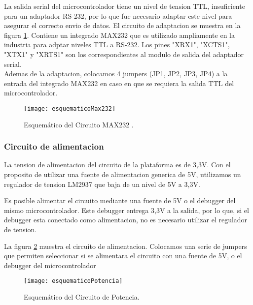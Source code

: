 La salida serial del microcontrolador tiene un nivel de tension TTL, insuficiente para un adaptador RS-232, por lo que fue necesario adaptar este nivel para asegurar el correcto envio de datos. El circuito de adaptacion se muestra en la figura \ref{fig:esquematicoMax232}. Contiene un integrado MAX232 que es utilizado ampliamente en la industria para adptar niveles TTL a RS-232. Los pines "XRX1", "XCTS1", "XTX1" y "XRTS1" son los correspondientes al modulo de salida del adaptador serial. \\

Ademas de la adaptacion, colocamos 4 jumpers (JP1, JP2, JP3, JP4) a la entrada del integrado MAX232 en caso en que se requiera la salida TTL del microcontrolador. \\

\begin{figure}[H]
  \centering
  \texttt{[image: esquematicoMax232]}
  \caption{Esquemático del Circuito MAX232 .}\label{fig:esquematicoMax232}
\end{figure}


\subsubsection{Circuito de alimentacion}
\label{it3:ssub:circuito_de_alimentacion}

La tension de alimentacion del circuito de la plataforma es de 3,3V. Con el proposito de utilizar una fuente de alimentacion generica de 5V, utilizamos un regulador de tension LM2937 que baja de un nivel de 5V a 3,3V.

Es posible alimentar el circuito mediante una fuente de 5V o el debugger del mismo microcontrolador. Este debugger entrega 3,3V a la salida, por lo que, si el debugger esta conectado como alimentacion, no es necesario utilizar el regulador de tension.

La figura \ref{fig:esquematicoPotencia} muestra el circuito de alimentacion. Colocamos una serie de jumpers que permiten seleccionar si se alimentara el circuito con una fuente de 5V, o el debugger del microcontrolador

\begin{figure}[H]
  \centering
  \texttt{[image: esquematicoPotencia]}
  \caption{Esquemático del Circuito de Potencia.}\label{fig:esquematicoPotencia}
\end{figure}

